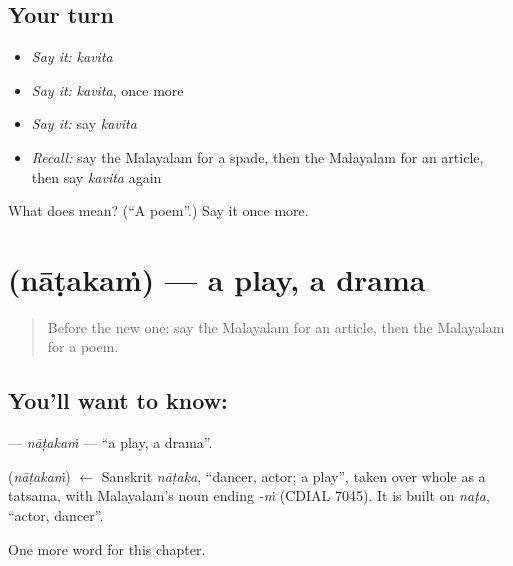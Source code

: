 \subsection*{Your turn}
\begin{itemize}
\raggedright
  \item \emph{Say it:} \emph{kavita}
  \item \emph{Say it:} \emph{kavita}, once more
  \item \emph{Say it:} say \emph{kavita}
  \item \emph{Recall:} say the Malayalam for a spade, then the Malayalam for an article, then say \emph{kavita} again
\end{itemize}

\begin{tcolorbox}[breakable,colback=teal!4,colframe=teal!35!black,title={Before you move on}]
What does  mean? (\textquotedblleft{}A poem\textquotedblright{}.) Say it once more.
\end{tcolorbox}
\section[\texorpdfstring{\ml{നാടകം} (nāṭakaṁ)}{നാടകം (nāṭakaṁ)}]{ (nāṭakaṁ) — a play, a drama}

\label{lesson:ML-C329-natakam}



\begin{quote}
Before the new one: say the Malayalam for an article, then the Malayalam for a poem.
\end{quote}

\subsection*{You'll want to know: }
\textbf{} — \emph{nāṭakaṁ} — \textquotedblleft{}a play, a drama\textquotedblright{}.

\begin{cousinweb}
\textbf{} (\emph{nāṭakaṁ}) $\leftarrow$ Sanskrit \emph{nāṭaka}, \textquotedblleft{}dancer, actor; a play\textquotedblright{}, taken over whole as a tatsama, with Malayalam's noun ending \emph{-ṁ} (CDIAL 7045). It is built on \emph{naṭa}, \textquotedblleft{}actor, dancer\textquotedblright{}.
\end{cousinweb}

\begin{grammarlens}[title={What you've built}]
One more word for this chapter.
\end{grammarlens}

